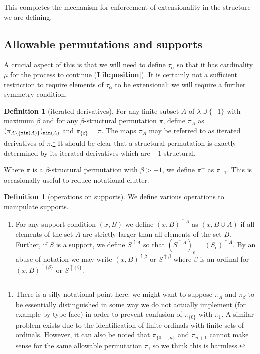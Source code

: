\documentclass{article}
\theoremstyle{definition}
\newtheorem{definition}[theorem]{Definition}
\theoremstyle{remark}
\newcommand{\ihref}[1]{(\textbf{I\ref{#1}})}
\begin{document}
{%
This completes the mechanism for enforcement of extensionality in the structure we are defining.

\subsection{Allowable permutations and supports}

A crucial aspect of this is that we will need to define $\tau_\alpha$ so that it has cardinality $\mu$ for the process to continue {\ihref{ih:position}}.  It is certainly not a sufficient restriction to require elements of $\tau_\alpha$ to be extensional:  we will require a further symmetry condition.

\begin{definition}[iterated derivatives]
  For any finite subset $A$ of $\lambda \cup \{-1\}$ with maximum $\beta$ and for any $\beta$-structural permutation $\pi$,
  define $\pi_A$ as $(\pi_{A \setminus \{{\tt min}(A)\}})_{{\tt min}(A)}$ and $\pi_{\{\beta\}} = \pi$.  The maps $\pi_A$ may be referred to as iterated derivatives of $\pi$.\footnote{There is a silly notational point here:  we might want to suppose $\pi_A$ and $\pi_\beta$ to be essentially distinguished in some way we do not actually implement (for example by type face) in order to prevent confusion of $\pi_{\{0\}}$ with $\pi_1$.  A similar problem exists due to the identification of finite ordinals with finite sets of ordinals.  However, it can also be noted that $\pi_{\{0,\ldots,n\}}$ and $\pi_{n+1}$ cannot make sense for the same allowable permutation $\pi$, so we think this is harmless.}  It should be clear that a structural permutation is exactly determined by its iterated derivatives which are $-1$-structural.

  Where $\pi$ is a $\beta$-structural permutation with $\beta>-1$, we define $\pi^+$ as $\pi_{-1}$.  This is occasionally useful to reduce notational clutter.
\end{definition}

\begin{definition}[operations on supports]\label{def:support_operations}
We define various operations to manipulate supports.
\begin{enumerate}
\item For any support condition $(x,B)$ we define $(x,B)^{\uparrow A}$ as $(x,B\cup A)$ if all elements of the set $A$ are strictly larger than all elements of the set $B$.
Further, if $S$ is a support, we define $S^{\uparrow A}$ so that $(S^{\uparrow A})_\epsilon = (S_\epsilon)^{\uparrow A}$.  By an abuse of notation we may write $(x,B)^{\uparrow \beta}$ or $S^{\uparrow \beta}$ where $\beta$ is an ordinal for $(x,B)^{\uparrow \{\beta\}}$ or $S^{\uparrow \{\beta\}}$.


\end{enumerate}
\end{definition}}
\end{document}
